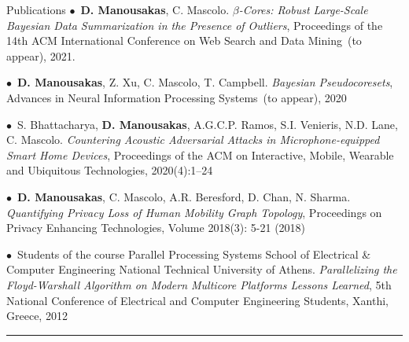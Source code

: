 \documentclass[11pt]{resume}
\begin{document}
\begin{category}{Publications}
\citemnobullet $\bullet$~\textbf{D. Manousakas}, C. Mascolo. \emph{$\beta$-Cores: Robust Large-Scale Bayesian Data Summarization in the Presence of Outliers}, Proceedings of the 14th ACM International Conference on Web Search and Data Mining~(to appear), 2021.%

\citemnobullet $\bullet$~\textbf{D. Manousakas}, Z. Xu, C. Mascolo, T. Campbell. \emph{Bayesian Pseudocoresets}, Advances in Neural Information Processing Systems~(to appear), 2020 

\citemnobullet $\bullet$~S. Bhattacharya, \textbf{D. Manousakas}, A.G.C.P. Ramos, S.I. Venieris, N.D. Lane, C. Mascolo. \emph{Countering Acoustic Adversarial Attacks in Microphone-equipped Smart Home Devices}, Proceedings of the ACM on Interactive, Mobile, Wearable and Ubiquitous Technologies, 2020(4):1--24

\citemnobullet $\bullet$~\textbf{D. Manousakas}, C. Mascolo, A.R. Beresford, D. Chan, N. Sharma. \emph{Quantifying Privacy Loss of Human Mobility Graph Topology}, Proceedings on Privacy Enhancing Technologies, Volume 2018(3): 5-21 (2018)

\citemnobullet $\bullet$~Students of the course Parallel Processing Systems  School of Electrical \& Computer Engineering National Technical University of Athens.
\textit{Parallelizing the Floyd-Warshall Algorithm on
	Modern Multicore Platforms
	Lessons Learned}, 5th National Conference of Electrical and Computer Engineering Students, Xanthi, Greece, 2012 

\noindent\rule{\textwidth}{0.2pt}
\end{category}
\end{document}
